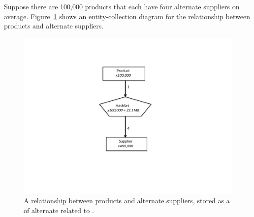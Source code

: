 
Suppose there are 100,000 products that each have four alternate suppliers on
average. Figure~\ref{fig:product-hashset} shows an entity-collection diagram for
the relationship between products and alternate suppliers.
 \begin{figure}
  \centering
 \includegraphics[width=.80\textwidth]{part1/Figures/collections/product-hashset.pdf}
 \caption{A relationship between products and alternate suppliers,
  stored as a
   of alternate  related to .}
  \label{fig:product-hashset}
\end{figure}


